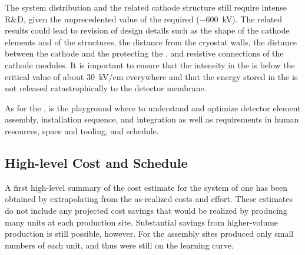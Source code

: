 The \dual {} system distribution and the related cathode structure still require intense R\&D, given the unprecedented value of the required  (\SI{-600}{\kV}).
The related results could lead to revision of design details such as the shape of the cathode elements and of the %
 structures, the distance from the cryostat walls, the distance between the cathode and the %
 protecting the , and resistive connections of the cathode modules. It is important to ensure that the \efield intensity in the \lar is below the critical value of  about \SI{30}{\kV/\cm} everywhere and that the energy stored in the \fc is not  released catastrophically to the detector membrane. %

As for the ,  is the playground where to understand and optimize detector element assembly, installation sequence, and integration as well as requirements in %
human resources, space and tooling, and schedule. 



%
%
%
\subsection{High-level Cost and Schedule}
\label{sec:fddp-hv-org-cs}

A first high-level summary of the cost estimate for the  system of one  has been obtained by extrapolating from the as-realized  costs and effort. These estimates do not include any projected cost savings that would be realized by producing many units at each production site. %
Substantial savings from higher-volume production is still possible, however. For  the assembly sites produced only small numbers of each unit, and thus were still on the learning curve. 


